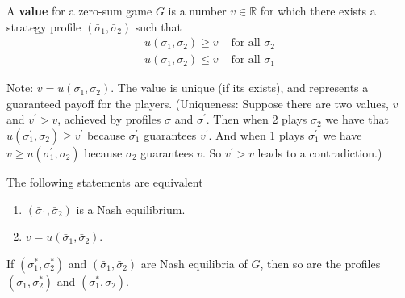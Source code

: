 \documentclass[11pt]{elegantbook_2}
\begin{document}
\begin{definition}
    A \textbf{value} for a zero-sum game $G$ is a number $v \in \mathbb{R}$ for which there exists a strategy profile $\left(\bar{\sigma}_1, \bar{\sigma}_2\right)$ such that
    $$
    \begin{matrix}u\left(\bar{\sigma}_1, \sigma_2\right) \geq v & \text { for all } \sigma_2 \\ u\left(\sigma_1, \bar{\sigma}_2\right) \leq v & \text { for all } \sigma_1\end{matrix}
    $$
\end{definition}
Note: $v=u\left(\bar{\sigma}_1, \bar{\sigma}_2\right)$.
The value is unique (if its exists), and represents a guaranteed payoff for the players.
(Uniqueness: Suppose there are two values, $v$ and $v^{\prime}>v$, achieved by profiles $\sigma$ and $\sigma^{\prime}$. Then when 2 plays $\sigma_2$ we have that $u\left(\sigma_1^{\prime}, \sigma_2\right) \geq v^{\prime}$ because $\sigma_1^{\prime}$ guarantees $v^{\prime}$. And when 1 plays $\sigma_1^{\prime}$ we have $v \geq u\left(\sigma_1^{\prime}, \sigma_2\right)$ because $\sigma_2$ guarantees $v$. So $v^{\prime}>v$ leads to a contradiction.)

\begin{proposition}
    The following statements are equivalent
    \begin{enumerate}
        \item $\left(\bar{\sigma}_1, \bar{\sigma}_2\right)$ is a Nash equilibrium.
        \item $v=u\left(\bar{\sigma}_1, \bar{\sigma}_2\right)$.
    \end{enumerate}
\end{proposition}


\begin{corollary}
    If $\left(\sigma_1^*, \sigma_2^*\right)$ and $\left(\bar{\sigma}_1, \bar{\sigma}_2\right)$ are Nash equilibria of $G$, then so are the profiles $\left(\bar{\sigma}_1, \sigma_2^*\right)$ and $\left(\sigma_1^*, \bar{\sigma}_2\right)$.
\end{corollary}
\end{document}
